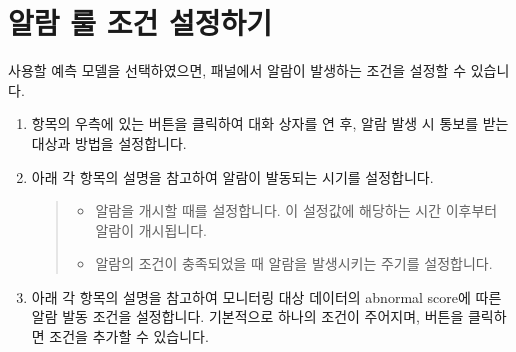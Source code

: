 \documentclass[letterpaper,10pt,english]{sphinxmanual}
\begin{document}
\section{알람 룰 조건 설정하기}
\label{\detokenize{part02/index:alarm-rule-settings}}\label{\detokenize{part02/index:id6}}
사용할 예측 모델을 선택하였으면,  패널에서 알람이 발생하는 조건을 설정할 수 있습니다.
\begin{enumerate}
%
\item {} 
 항목의 우측에 있는  버튼을 클릭하여 대화 상자를 연 후, 알람 발생 시 통보를 받는 대상과 방법을 설정합니다.
\begin{quote}

\begin{figure}[H]
\centering

\noindent{}
\end{figure}
\end{quote}

\item {} 
아래 각 항목의 설명을 참고하여 알람이 발동되는 시기를 설정합니다.
\begin{quote}

\begin{figure}[H]
\centering

\noindent{}
\end{figure}
\begin{itemize}
\item {} 
 알람을 개시할 때를 설정합니다. 이 설정값에 해당하는 시간 이후부터 알람이 개시됩니다.

\item {} 
 알람의 조건이 충족되었을 때 알람을 발생시키는 주기를 설정합니다.

\end{itemize}
\end{quote}

\item {} 
아래 각 항목의 설명을 참고하여 모니터링 대상 데이터의 abnormal score에 따른 알람 발동 조건을 설정합니다. 기본적으로 하나의 조건이 주어지며,  버튼을 클릭하면 조건을 추가할 수 있습니다.
\begin{quote}

\begin{figure}[H]
\centering


\end{figure}
\end{quote}
\end{enumerate}
\end{document}
